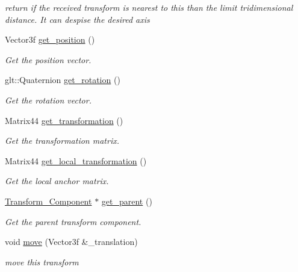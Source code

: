 \begin{DoxyCompactItemize}
\begin{DoxyCompactList}\small\item\em return if the received transform is nearest to this than the limit tridimensional distance. It can despise the desired axis \end{DoxyCompactList}\item 
Vector3f \mbox{\hyperlink{classbanita_1_1_transform___component_a080736ede5f09898a8b28c2b22e60c61}{get\+\_\+position}} ()
\begin{DoxyCompactList}\small\item\em Get the position vector. \end{DoxyCompactList}\item 
glt\+::\+Quaternion \mbox{\hyperlink{classbanita_1_1_transform___component_a914ced98c4598751de9448cf1491d990}{get\+\_\+rotation}} ()
\begin{DoxyCompactList}\small\item\em Get the rotation vector. \end{DoxyCompactList}\item 
Matrix44 \mbox{\hyperlink{classbanita_1_1_transform___component_a9b955e7fd44d256dd862f61502ab9ec1}{get\+\_\+transformation}} ()
\begin{DoxyCompactList}\small\item\em Get the transformation matrix. \end{DoxyCompactList}\item 
Matrix44 \mbox{\hyperlink{classbanita_1_1_transform___component_a8ffcb477f5e312f75cfb5c9eb9c4ebd1}{get\+\_\+local\+\_\+transformation}} ()
\begin{DoxyCompactList}\small\item\em Get the local anchor matrix. \end{DoxyCompactList}\item 
\mbox{\hyperlink{classbanita_1_1_transform___component}{Transform\+\_\+\+Component}} $\ast$ \mbox{\hyperlink{classbanita_1_1_transform___component_a8503ea9581479c4d3a7b5e7992d669f2}{get\+\_\+parent}} ()
\begin{DoxyCompactList}\small\item\em Get the parent transform component. \end{DoxyCompactList}\item 
void \mbox{\hyperlink{classbanita_1_1_transform___component_a670a3c4266dc6e2ae1e89940684acc5b}{move}} (Vector3f \&\+\_\+translation)
\begin{DoxyCompactList}\small\item\em move this transform \end{DoxyCompactList}\item 

\end{DoxyCompactItemize}
